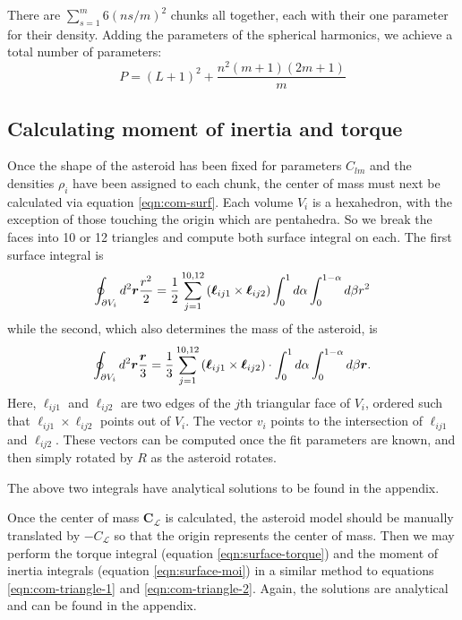\documentclass[aps,twocolumn,secnumarabic,balancelastpage,amsmath,amssymb,nofootinbib,floatfix]{revtex4-1}
\begin{document}
There are $\sum_{s=1}^m 6(ns/m)^2$ chunks all together, each with their one parameter for their density. Adding the parameters of the spherical harmonics, we achieve a total number of parameters:
\begin{equation}
    P = (L+1)^2 + \frac{n^2(m+1)(2m+1)}{m}
    \label{eqn:num-parameters}
\end{equation}


\subsection{Calculating moment of inertia and torque}
\label{sec:equations}
Once the shape of the asteroid has been fixed for parameters $C_{lm}$ and the densities $\rho_i$ have been assigned to each chunk, the center of mass must next be calculated via equation \ref{eqn:com-surf}. Each volume $V_i$ is a hexahedron, with the exception of those touching the origin which are pentahedra. So we break the faces into 10 or 12 triangles and compute both surface integral on each. The first surface integral is
\begin{equation}
    \oint_{\partial V_i} d^2 \bm r \frac{r^2}{2} =
    \frac{1}{2}\sum_{j=1}^{10, 12} \left( \bm \ell_{ij1}\times\bm \ell_{ij2} \right)\int_0^1 d\alpha \int_0^{1-\alpha} d\beta r^2
    \label{eqn:com-triangle-1}
\end{equation}
while the second, which also determines the mass of the asteroid, is 
\begin{equation}
    \oint_{\partial V_i} d^2 \bm r \frac{\bm r}{3} =
    \frac{1}{3}\sum_{j=1}^{10, 12} \left( \bm \ell_{ij1}\times\bm \ell_{ij2} \right)\cdot \int_0^1 d\alpha \int_0^{1-\alpha} d\beta \bm r.
    \label{eqn:com-triangle-2}
\end{equation}
Here, $\bm \ell_{ij1}$ and $\bm \ell_{ij2}$ are two edges of the $j$th triangular face of $V_i$, ordered such that $\bm \ell_{ij1} \times \bm \ell_{ij2}$ points out of $V_i$. The vector $v_i$ points to the intersection of $\bm \ell_{ij1}$ and $\bm \ell_{ij2}$. These vectors can be computed once the fit parameters are known, and then simply rotated by $R$ as the asteroid rotates.

The above two integrals have analytical solutions to be found in the appendix.

Once the center of mass $\bm C_{\mathcal L}$ is calculated, the asteroid model should be manually translated by $\bm -C_{\mathcal L}$ so that the origin represents the center of mass. Then we may perform the torque integral (equation \ref{eqn:surface-torque}) and the moment of inertia integrals (equation \ref{eqn:surface-moi}) in a similar method to equations \ref{eqn:com-triangle-1} and \ref{eqn:com-triangle-2}. Again, the solutions are analytical and can be found in the appendix.
\end{document}
